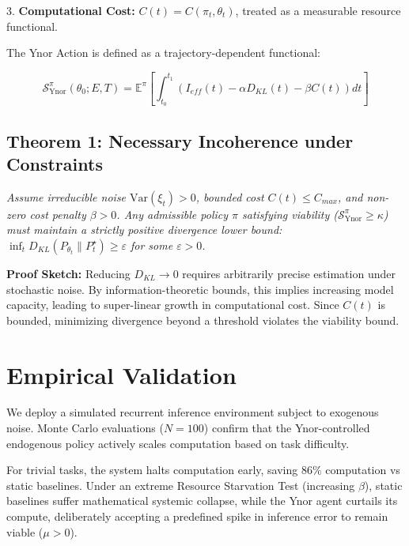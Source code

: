 \documentclass{article}
\begin{document}
3. \textbf{Computational Cost:} $C(t) = C(\pi_t, \theta_t)$, treated as a measurable resource functional.



The Ynor Action is defined as a trajectory-dependent functional:

\begin{equation}

\mathcal{S}_{\text{Ynor}}^\pi(\theta_0; E, T) = \mathbb{E}^\pi \left[ \int_{t_0}^{t_1} \left( I_{eff}(t) - \alpha D_{KL}(t) - \beta C(t) \right) dt \right]

\end{equation}



\subsection{Theorem 1: Necessary Incoherence under Constraints}

\textit{Assume irreducible noise $\mathrm{Var}(\xi_t) > 0$, bounded cost $C(t) \le C_{max}$, and non-zero cost penalty $\beta > 0$. Any admissible policy $\pi$ satisfying viability ($\mathcal{S}_{\text{Ynor}}^\pi \ge \kappa$) must maintain a strictly positive divergence lower bound: $\inf_t D_{KL}(P_{\theta_t} \parallel P_t^\star) \ge \varepsilon$ for some $\varepsilon > 0$.}



\textbf{Proof Sketch:} Reducing $D_{KL} \to 0$ requires arbitrarily precise estimation under stochastic noise. By information-theoretic bounds, this implies increasing model capacity, leading to super-linear growth in computational cost. Since $C(t)$ is bounded, minimizing divergence beyond a threshold violates the viability bound.



\section{Empirical Validation}

We deploy a simulated recurrent inference environment subject to exogenous noise. Monte Carlo evaluations ($N=100$) confirm that the Ynor-controlled endogenous policy actively scales computation based on task difficulty. 

For trivial tasks, the system halts computation early, saving $86\%$ computation vs static baselines. Under an extreme Resource Starvation Test (increasing $\beta$), static baselines suffer mathematical systemic collapse, while the Ynor agent curtails its compute, deliberately accepting a predefined spike in inference error to remain viable ($\mu > 0$).
\end{document}
